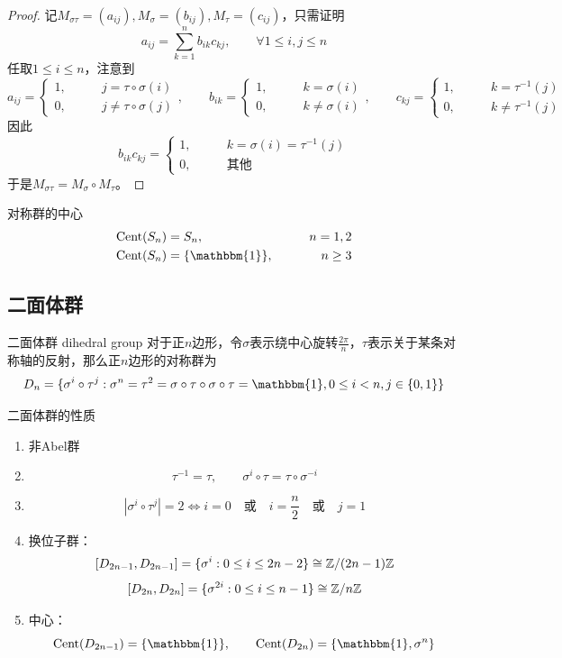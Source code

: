\begin{proof}
	记$M_{\sigma\tau}=(a_{ij}),M_{\sigma}=(b_{ij}),M_{\tau}=(c_{ij})$，只需证明
	$$
	a_{ij}=\sum_{k=1}^{n}b_{ik}c_{kj},\qquad \forall 1\le i,j\le n
	$$
	任取$1\le i \le n$，注意到
	$$
	a_{ij}=\begin{cases}
		1,\qquad & j=\tau\circ \sigma(i)\\
		0,\qquad & j\ne\tau\circ \sigma(j)
	\end{cases},\qquad b_{ik}=\begin{cases}
		1,\qquad & k=\sigma(i)\\
		0,\qquad & k\ne\sigma(i)
	\end{cases},\qquad 
	c_{kj}=\begin{cases}
		1,\qquad & k=\tau^{-1}(j)\\
		0,\qquad & k\ne\tau^{-1}(j)
	\end{cases}
	$$
	因此
	$$
	b_{ik}c_{kj}=\begin{cases}
		1,\qquad & k=\sigma(i)=\tau^{-1}(j)\\
		0,\qquad & \text{其他}
	\end{cases}
	$$
	于是$M_{\sigma\tau}=M_\sigma\circ M_\tau$。
\end{proof}

\begin{proposition}{对称群的中心}
	\begin{align*}
		&\mathrm{Cent}(S_n)=S_n,\qquad & n=1,2\\
		&\mathrm{Cent}(S_n)=\{ \mathbbm{1} \},\qquad & n\ge 3
	\end{align*}
\end{proposition}

\subsection{二面体群}

\begin{definition}{二面体群 dihedral group}
	对于正$n$边形，令$\sigma$表示绕中心旋转$\frac{2\pi}{n}$，$\tau$表示关于某条对称轴的反射，那么正$n$边形的对称群为
	$$
	D_n=\{ \sigma^i \circ \tau^j:\sigma^n=\tau^2=\sigma \circ \tau \circ \sigma \circ \tau=\mathbbm{1},0\le i <n,j\in\{0,1\} \}
	$$
\end{definition}

\begin{proposition}{二面体群的性质}
	\begin{enumerate}
		\item 非Abel群
		\item 
		$$
		\tau^{-1}=\tau,\qquad \sigma^{i}\circ\tau=\tau\circ\sigma^{-i}
		$$
		\item 
		$$
		|\sigma^i\circ\tau^j|=2
		\iff
		i=0
		\quad \text{或} \quad
		i=\frac{n}{2}
		\quad \text{或} \quad
		j=1
		$$
		\item 换位子群：
		$$
		[D_{2n-1},D_{2n-1}]=\{ \sigma^i:0\le i \le 2n-2 \}\cong \mathbb{Z}/(2n-1)\mathbb{Z}
		$$
		$$
		[D_{2n},D_{2n}]=\{ \sigma^{2i}:0\le i\le n-1 \}\cong\mathbb{Z}/n\mathbb{Z}
		$$
		\item 中心：
		$$
		\mathrm{Cent}(D_{2n-1})=\{ \mathbbm{1} \},\qquad 
		\mathrm{Cent}(D_{2n})=\{ \mathbbm{1},\sigma^n \}
		$$
	\end{enumerate}
\end{proposition}

